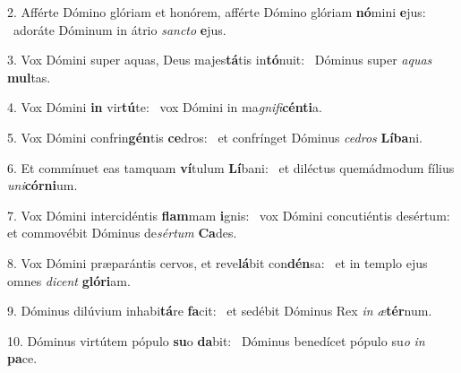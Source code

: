 2. Afférte Dómino glóriam et honórem, afférte Dómino glóriam \textbf{nó}mini \textbf{e}jus: \ast\  adoráte Dóminum in átrio \textit{sanc}\textit{to} \textbf{e}jus.\

3. Vox Dómini super aquas, Deus majes\textbf{tá}tis in\textbf{tó}nuit: \ast\  Dóminus super \textit{a}\textit{quas} \textbf{mul}tas.\

4. Vox Dómini \textbf{in} vir\textbf{tú}te: \ast\  vox Dómini in ma\textit{gni}\textit{fi}\textbf{cén}\textbf{ti}a.\

5. Vox Dómini confrin\textbf{gén}tis \textbf{ce}dros: \ast\  et confrínget Dóminus \textit{ce}\textit{dros} \textbf{Lí}\textbf{ba}ni.\

6. Et commínuet eas tamquam \textbf{ví}tulum \textbf{Lí}bani: \ast\  et diléctus quemádmodum fílius \textit{u}\textit{ni}\textbf{cór}\textbf{ni}um.\

7. Vox Dómini intercidéntis \textbf{flam}mam \textbf{i}gnis: \ast\  vox Dómini concutiéntis desértum: et commovébit Dóminus de\textit{sér}\textit{tum} \textbf{Ca}des.\

8. Vox Dómini præparántis cervos, et reve\textbf{lá}bit con\textbf{dén}sa: \ast\  et in templo ejus omnes \textit{di}\textit{cent} \textbf{gló}\textbf{ri}am.\

9. Dóminus dilúvium inhabi\textbf{tá}re \textbf{fa}cit: \ast\  et sedébit Dóminus Rex \textit{in} \textit{æ}\textbf{tér}num.\

10. Dóminus virtútem pópulo \textbf{su}o \textbf{da}bit: \ast\  Dóminus benedícet pópulo su\textit{o} \textit{in} \textbf{pa}ce.\


